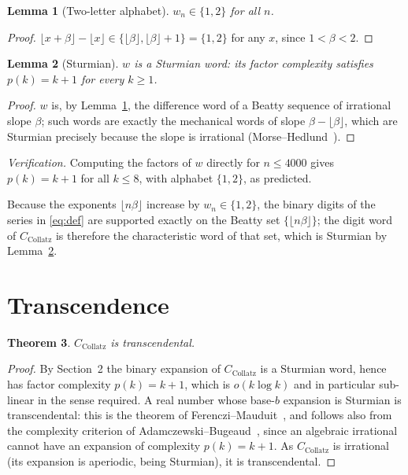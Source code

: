 \documentclass[11pt,a4paper]{article}
\theoremstyle{plain}
\newtheorem{theorem}{Theorem}[section]
\newtheorem{lemma}[theorem]{Lemma}
\theoremstyle{definition}
\newcommand{\CC}{C_{\mathrm{Collatz}}}
\begin{document}
\begin{lemma}[Two-letter alphabet]\label{lem:gap}
$w_n\in\{1,2\}$ for all $n$.
\end{lemma}
\begin{proof}
$\lfloor x+\beta\rfloor-\lfloor x\rfloor\in\{\lfloor\beta\rfloor,\lfloor\beta\rfloor+1\}
=\{1,2\}$ for any $x$, since $1<\beta<2$.
\end{proof}

\begin{lemma}[Sturmian]\label{lem:sturm}
$w$ is a Sturmian word: its factor complexity satisfies $p(k)=k+1$ for every $k\ge1$.
\end{lemma}
\begin{proof}
$w$ is, by Lemma~\ref{lem:gap}, the difference word of a Beatty sequence of irrational slope
$\beta$; such words are exactly the mechanical words of slope $\beta-\lfloor\beta\rfloor$,
which are Sturmian precisely because the slope is irrational (Morse--Hedlund~\cite{mh}).
\end{proof}
\noindent \emph{Verification.} Computing the factors of $w$ directly for $n\le4000$ gives
$p(k)=k+1$ for all $k\le8$, with alphabet $\{1,2\}$, as predicted.

Because the exponents $\lfloor n\beta\rfloor$ increase by $w_n\in\{1,2\}$, the binary digits
of the series in \eqref{eq:def} are supported exactly on the Beatty set $\{\lfloor
n\beta\rfloor\}$; the digit word of $\CC$ is therefore the characteristic word of that set,
which is Sturmian by Lemma~\ref{lem:sturm}.

\section{Transcendence}
\begin{theorem}\label{thm:main}
$\CC$ is transcendental.
\end{theorem}
\begin{proof}
By Section~2 the binary expansion of $\CC$ is a Sturmian word, hence has factor complexity
$p(k)=k+1$, which is $o(k\log k)$ and in particular sub-linear in the sense required.
A real number whose base-$b$ expansion is Sturmian is transcendental: this is the theorem of
Ferenczi--Mauduit~\cite{fm}, and follows also from the complexity criterion of
Adamczewski--Bugeaud~\cite{ab}, since an algebraic irrational cannot have an expansion of
complexity $p(k)=k+1$. As $\CC$ is irrational (its expansion is aperiodic, being Sturmian),
it is transcendental.
\end{proof}
\end{document}

